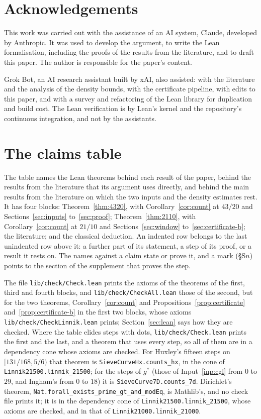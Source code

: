 \documentclass[11pt]{article}
\theoremstyle{definition}
\newcommand{\lean}[1]{\texttt{#1}}
\newcommand{\file}[1]{\nolinkurl{#1}}
\begin{document}
\section*{Acknowledgements}

This work was carried out with the assistance of an AI system, Claude, developed by Anthropic. It was used to develop
the argument, to write the Lean formalisation, including the proofs of the results from the literature, and to draft
this paper. The author is responsible for the paper's content.

Grok Bot, an AI research assistant built by xAI, also assisted: with the literature and the analysis of the density
bounds, with the certificate pipeline, with edits to this paper, and with a survey and refactoring of the Lean library
for duplication and build cost. The Lean verification is by Lean's kernel and the repository's continuous
integration, and not by the assistants.

\appendix

\section{The claims table}\label{app:claims}

The table names the Lean theorems behind each result of the paper, behind the results from the literature that its
argument uses directly, and behind the main results from the literature on which the two inputs and the density
estimates rest. It has four blocks: Theorem~\ref{thm:4320}, with Corollary~\ref{cor:count} at $43/20$ and
Sections~\ref{sec:inputs} to~\ref{sec:proof}; Theorem~\ref{thm:2110}, with Corollary~\ref{cor:count} at $21/10$ and
Sections~\ref{sec:window} to~\ref{sec:certificate-b}; the literature; and the classical deduction. An indented row
belongs to the last unindented row above it: a further part of its statement, a step of its proof, or a result it
rests on. The names against a claim state or prove it, and a mark (\S S$n$) points to the section of the supplement
that proves the step.

The file \file{lib/check/Check.lean} prints the axioms of the theorems of the first, third and fourth blocks, and
\file{lib/check/CheckAll.lean} those of the second, but for the two theorems, Corollary~\ref{cor:count} and
Propositions~\ref{prop:certificate} and~\ref{prop:certificate-b} in the first two blocks, whose axioms
\file{lib/check/CheckLinnik.lean} prints; Section~\ref{sec:lean} says how they are checked. Where the table
elides steps with dots, \file{lib/check/Check.lean} prints the first and the last, and a theorem that uses every step,
so all of them are in a dependency cone whose axioms are checked. For Huxley's fifteen steps on $[131/168, 5/6)$ that
theorem is \lean{SieveCurveHx.counts\_hx}, in the cone of \lean{Linnik21500.linnik\_21500}; for the steps of $g^*$
(those of Input~\ref{inp:cgl} from $0$ to $29$, and Ingham's from $0$ to $18$) it is \lean{SieveCurve7D.counts\_7d}.
Dirichlet's theorem, \lean{Nat.forall\_exists\_prime\_gt\_and\_modEq}, is Mathlib's, and no check file prints it; it is
in the dependency cone of \lean{Linnik21500.linnik\_21500}, whose axioms are checked, and in that of
\lean{Linnik21000.linnik\_21000}.
\end{document}
